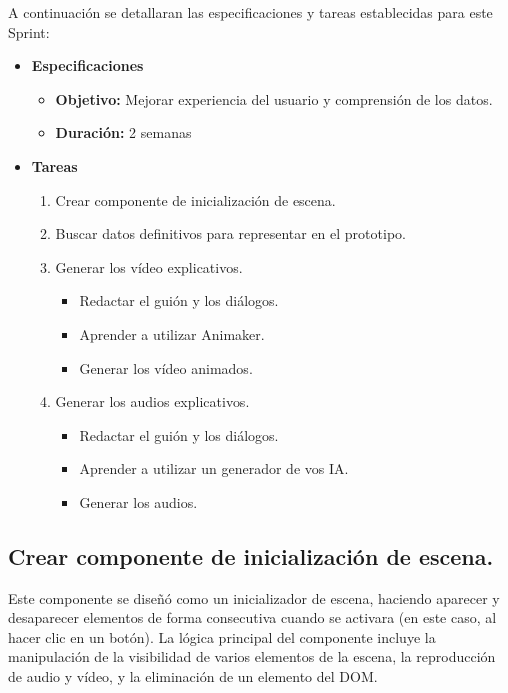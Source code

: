 \documentclass[a4paper, 12pt]{book}
\begin{document}
        A continuación se detallaran las especificaciones y tareas establecidas para este Sprint:
        \begin{itemize}
            \item \textbf{Especificaciones}
            \begin{itemize}
                \item \textbf{Objetivo:} Mejorar experiencia del usuario y comprensión de los datos.
                \item \textbf{Duración:} 2 semanas

            \end{itemize}
            
            \item \textbf{Tareas}
            \begin{enumerate}
                \item Crear componente de inicialización de escena.
                \item Buscar datos definitivos para representar en el prototipo. 
                \item Generar los vídeo explicativos.
                \begin{itemize}
                    \item Redactar el guión y los diálogos.
                    \item Aprender a utilizar Animaker.
                    \item Generar los vídeo animados.
                \end{itemize}
                \item Generar los audios explicativos.
                \begin{itemize}
                    \item Redactar el guión y los diálogos.
                    \item Aprender a utilizar un generador de vos IA.
                    \item Generar los audios.
                \end{itemize}

\end{enumerate}
\end{itemize}

\subsection{Crear componente de inicialización de escena.}

Este componente se diseñó como un inicializador de escena, haciendo aparecer y desaparecer elementos de forma consecutiva cuando se activara (en este caso, al hacer clic en un botón). La lógica principal del componente incluye la manipulación de la visibilidad de varios elementos de la escena, la reproducción de audio y vídeo, y la eliminación de un elemento del DOM.
\end{document}
